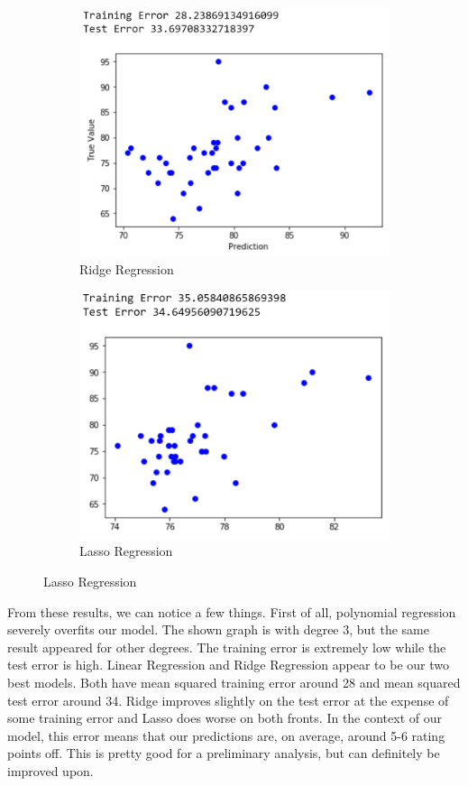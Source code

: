 \documentclass{article}
\begin{document}
\begin{figure}[h]
\begin{subfigure}{0.5\textwidth}
\includegraphics[width=0.9\linewidth]{nbaridgereg.png} 
\caption{Ridge Regression}
\end{subfigure}
\begin{subfigure}{0.5\textwidth}
\includegraphics[width=0.9\linewidth]{nbalassoreg.png}
\caption{Lasso Regression}
\end{subfigure}
\end{figure}
From these results, we can notice a few things. First of all, polynomial regression severely overfits our model. The shown graph is with degree 3, but the same result appeared for other degrees. The training error is extremely low while the test error is high. Linear Regression and Ridge Regression appear to be our two best models. Both have mean squared training error around 28 and mean squared test error around 34. Ridge improves slightly on the test error at the expense of some training error and Lasso does worse on both fronts. In the context of our model, this error means that our predictions are, on average, around 5-6 rating points off. This is pretty good for a preliminary analysis, but can definitely be improved upon. 
\end{document}
